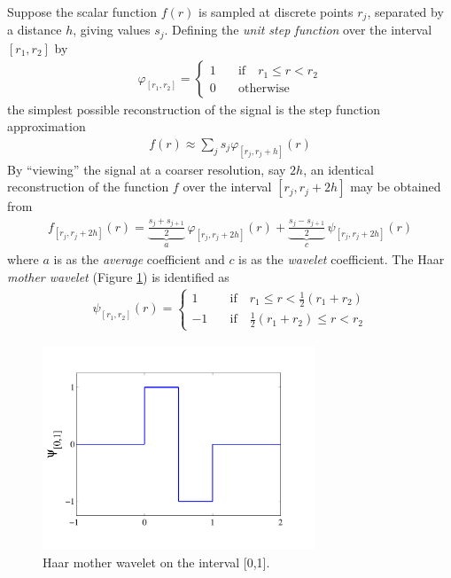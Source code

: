 \documentclass[11pt]{book}
\begin{document}
Suppose the scalar function $f(r)$ is sampled at discrete points $r_j$, separated by a distance $h$, giving values $s_j$.  Defining the \emph{unit step function} over the interval $[r_1,r_2]$ by
\begin{eqnarray}
\varphi_{[r_1,r_2]} = \left\{ \begin{array}{ll} 1 & \quad \mbox{if} \quad r_1 \le r < r_2 \\ 0 & \quad \mbox{otherwise} \end{array} \right.
\end{eqnarray}
the simplest possible reconstruction of the signal is the step function approximation
\begin{eqnarray}
f(r) \approx \sum_j s_j \varphi_{[r_j,r_j+h]}(r)
\end{eqnarray}
By ``viewing'' the signal at a coarser resolution, say $2h$, an identical reconstruction of the function $f$ over the interval $[r_j,r_j+2h]$ may be obtained from
\begin{eqnarray}
\label{eqn_wavelet_decomp}
f_{[r_j,r_j+2h]}(r) = \underbrace{\frac{s_j+s_{j+1}}{2}}_a \,\varphi_{[r_j,r_j+2h]}(r) + \underbrace{\frac{s_j-s_{j+1}}{2}}_c \,\psi_{[r_j,r_j+2h]}(r)
\end{eqnarray}
where $a$ is as the \emph{average} coefficient and $c$ is as the \emph{wavelet} coefficient.  The Haar \emph{mother wavelet} (Figure \ref{fig_haar_mother}) is identified as
\begin{eqnarray}
\psi_{[r_1,r_2]}(r) = \left\{ \begin{array}{ll} 1 & \quad \mbox{if} \quad r_1\le r < \frac{1}{2}(r_1+r_2) \\ -1 & \quad \mbox{if} \quad \frac{1}{2}(r_1+r_2)\le r < r_2 \end{array} \right.
\end{eqnarray}

\begin{figure}[ht]
\centering
\includegraphics[width=3.2in]{FIGURES/haar_mother}
\vskip-0.2cm
\caption[Haar mother wavelet]{Haar mother wavelet on the interval [0,1].}
\label{fig_haar_mother}
\end{figure}
\end{document}
